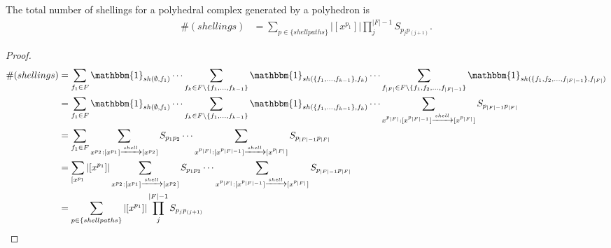 \begin{mythm}
The total number of shellings for a polyhedral complex generated by a polyhedron is  
\begin{align}
\#(shellings) &= \sum_{p \in \{shell paths\}}|[x^{p_1}]|\prod_j^{|F|-1}S_{p_jp_{(j+1)}} .
\end{align}
\end{mythm}
\begin{proof}
\begin{align}
\#(shellings) &= \sum_{f_1 \in F} \mathbbm{1}_{sh(\emptyset,f_1)} \cdots\sum_{f_k \in F\setminus \{f_1,\dots,f_{k-1}\}} \mathbbm{1}_{sh(\{f_1,\dots,f_{k-1}\}, f_k)}\cdots \sum_{f_{|F|} \in F\setminus \{f_1, f_2, \dots, f_{|F|-1}\}}\mathbbm{1}_{sh(\{f_1, f_2, \dots, f_{|F|-1}\},f_{|F|})}  \\
&= \sum_{f_1 \in F} \mathbbm{1}_{sh(\emptyset,f_1)} \cdots\sum_{f_k \in F\setminus \{f_1,\dots,f_{k-1}\}} \mathbbm{1}_{sh(\{f_1,\dots,f_{k-1}\}, f_k)}\cdots \sum_{x^{p_{|F|}}: [x^{p_{|F|-1}}] \xrightarrow{shell} [x^{p_{|F|}}]} S_{p_{|F|-1}p_{|F|}}  \\
&= \sum_{f_1 \in F} \sum_{x^{p_2}: [x^{p_1}] \xrightarrow{shell} [x^{p_2}]} S_{p_{1}p_{2}}  \cdots \sum_{x^{p_{|F|}}: [x^{p_{|F|-1}}] \xrightarrow{shell} [x^{p_{|F|}}]} S_{p_{|F|-1}p_{|F|}}  \\
&= \sum_{[x^{p_1}} |[x^{p_1}]| \sum_{x^{p_2}: [x^{p_1}] \xrightarrow{shell} [x^{p_2}]} S_{p_{1}p_{2}}  \cdots \sum_{x^{p_{|F|}}: [x^{p_{|F|-1}}] \xrightarrow{shell} [x^{p_{|F|}}]} S_{p_{|F|-1}p_{|F|}}  \\
&= \sum_{p \in \{shell paths\}}|[x^{p_1}]|\prod_j^{|F|-1}S_{p_jp_{(j+1)}} 
\end{align}
\end{proof}

